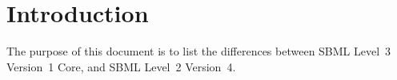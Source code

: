 
\section{Introduction}
\label{sec:introduction}

The purpose of this document is to list the differences between SBML
Level~3 Version~1 Core, and SBML Level~2 Version~4.
